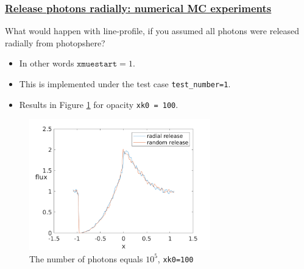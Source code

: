 \documentclass[../main/main.tex]{subfiles}
\begin{document}
\subsubsection{\underline{Release photons radially: numerical MC experiments}}
What would happen with line-profile, if you assumed all photons
were released radially from photopshere?
\begin{itemize}
\item In other words $\texttt{xmuestart} = 1$. 
\item This is implemented under the test case \texttt{test\_number=1}.
\item Results in Figure \ref{PCyg_mu_eq_1} for opacity \texttt{xk0 = 100}.
\end{itemize}

\begin{figure}[!htbp]
\centering
\includegraphics[width=0.7\textwidth]{../../introductory_exercises/P_Cygni_profile_UV_resonance/data/compare_radial_xk0100.png}
\caption{The number of photons equals $10^{5}$, \texttt{xk0=100}}
\label{PCyg_mu_eq_1}
\end{figure}
\end{document}
